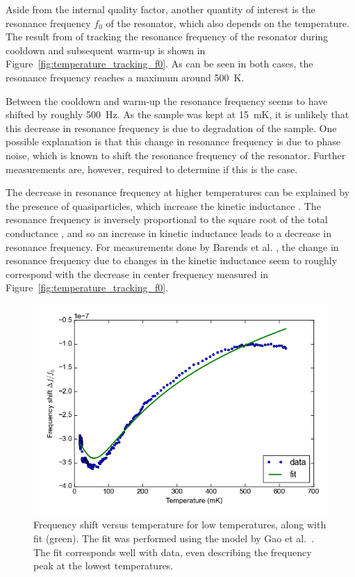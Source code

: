 \documentclass[12pt]{report}
\begin{document}
Aside from the internal quality factor, another quantity of interest is the resonance frequency $f_0$ of the resonator, which also depends on the temperature. The result from of tracking the resonance frequency of the resonator during cooldown and subsequent warm-up is shown in Figure~\ref{fig:temperature_tracking_f0}. As can be seen in both cases, the resonance frequency reaches a maximum around \SI{500}{\kelvin}.

Between the cooldown and warm-up the resonance frequency seems to have shifted by roughly \SI{500}{Hz}. As the sample was kept at \SI{15}{\milli \kelvin}, it is unlikely that this decrease in resonance frequency is due to degradation of the sample. One possible explanation is that this change in resonance frequency is due to phase noise, which is known to shift the resonance frequency of the resonator. Further measurements are, however, required to determine if this is the case.

The decrease in resonance frequency at higher temperatures can be explained by the presence of quasiparticles, which increase the kinetic inductance \cite[p.~91]{Geerlings}. The resonance frequency is inversely proportional to the square root of the total conductance \cite{barends2008contribution}, and so an increase in kinetic inductance leads to a decrease in resonance frequency. For measurements done by Barends et al. \cite{barends2008contribution}, the change in resonance frequency due to changes in the kinetic inductance seem to roughly correspond with the decrease in center frequency measured in Figure~\ref{fig:temperature_tracking_f0}.

\begin{figure}[h]
    \centering
    \includegraphics[width=.7\textwidth]{Figures/Temperature increase tracking - f0 vs T with fit.png}
    \caption{Frequency shift versus temperature for low temperatures, along with fit (green). The fit was performed using the model by Gao et al.~\cite{gao2008experimental}. The fit corresponds well with data, even describing the frequency peak at the lowest temperatures.}
    \label{fig:f0_vs_T_with_fit}
\end{figure}
\end{document}
